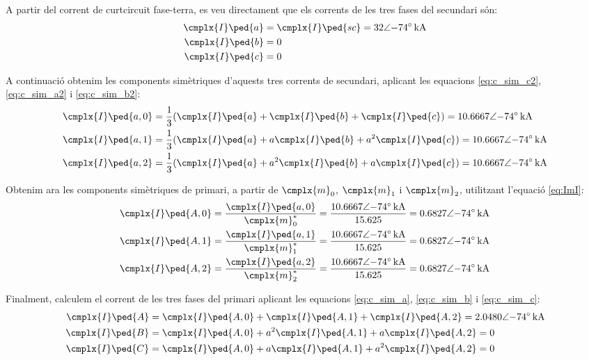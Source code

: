 \begin{exemple}[\CCasimSecTrafo{}]
    \begin{center}
       
    \end{center}

    A partir del corrent de curtcircuit fase-terra, es veu directament que els corrents de les tres fases del secundari són:
    \begin{align*}
        \cmplx{I}\ped{a} &= \cmplx{I}\ped{sc} = \complexqty{32:-74}{kA} \\
        \cmplx{I}\ped{b} &= 0  \\
        \cmplx{I}\ped{c} &= 0
    \end{align*}

    A continuació obtenim les components simètriques d'aquests tres corrents de secundari, aplicant les equacions \eqref{eq:c_sim_c2}, \eqref{eq:c_sim_a2} i \eqref{eq:c_sim_b2}:
    \begin{align*}
        \cmplx{I}\ped{a,0} &= \frac{1}{3} (\cmplx{I}\ped{a} + \cmplx{I}\ped{b} +
        \cmplx{I}\ped{c}) = \complexqty{10,6667:-74}{kA} \\
        \cmplx{I}\ped{a,1} &= \frac{1}{3} (\cmplx{I}\ped{a} + a \cmplx{I}\ped{b} +
         a^2 \cmplx{I}\ped{c}) = \complexqty{10,6667:-74}{kA}  \\
        \cmplx{I}\ped{a,2} &= \frac{1}{3} (\cmplx{I}\ped{a} + a^2 \cmplx{I}\ped{b} +
         a \cmplx{I}\ped{c}) = \complexqty{10,6667:-74}{kA}
    \end{align*}

    Obtenim ara les components simètriques de primari, a partir de $\cmplx{m}_0$, $\cmplx{m}_1$ i $\cmplx{m}_2$, utilitzant l'equació \eqref{eq:ImI}:
    \begin{align*}
        \cmplx{I}\ped{A,0} &= \frac{\cmplx{I}\ped{a,0}}{\cmplx{m}^*_0} = \frac{\complexqty{10,6667:-74}{kA}}{\num{15,625}} =  \complexqty{0,6827:-74}{kA}\\
        \cmplx{I}\ped{A,1} &= \frac{\cmplx{I}\ped{a,1}}{\cmplx{m}^*_1} = \frac{\complexqty{10,6667:-74}{kA}}{\num{15,625}} =  \complexqty{0,6827:-74}{kA} \\
        \cmplx{I}\ped{A,2} &= \frac{\cmplx{I}\ped{a,2}}{\cmplx{m}^*_2} = \frac{\complexqty{10,6667:-74}{kA}}{\num{15,625}} = \complexqty{0,6827:-74}{kA}
    \end{align*}

    Finalment, calculem el corrent de les tres fases del primari aplicant les equacions \eqref{eq:c_sim_a}, \eqref{eq:c_sim_b} i \eqref{eq:c_sim_c}:
     \begin{align*}
        \cmplx{I}\ped{A} &= \cmplx{I}\ped{A,0} + \cmplx{I}\ped{A,1} + \cmplx{I}\ped{A,2} = \complexqty{2,0480:-74}{kA} \\
        \cmplx{I}\ped{B} &= \cmplx{I}\ped{A,0} + a^2 \cmplx{I}\ped{A,1} + a \cmplx{I}\ped{A,2} = 0 \\
        \cmplx{I}\ped{C} &= \cmplx{I}\ped{A,0} + a \cmplx{I}\ped{A,1} + a^2 \cmplx{I}\ped{A,2} = 0
    \end{align*}


\end{exemple}
